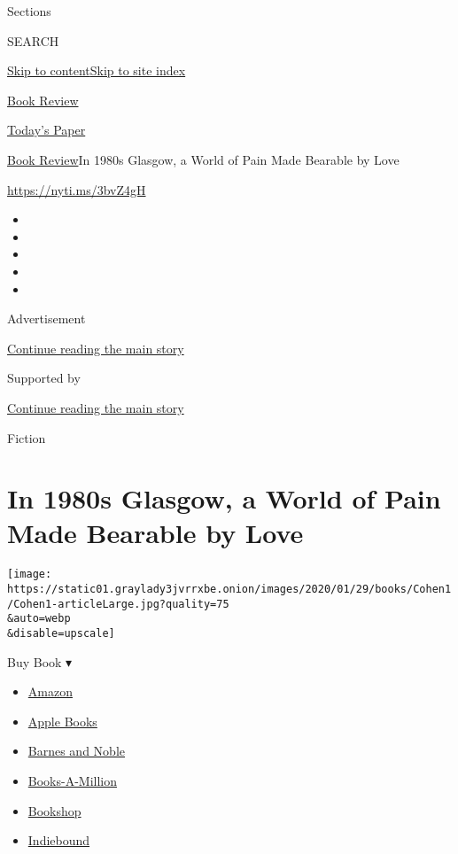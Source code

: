 Sections

SEARCH

\protect\hyperlink{site-content}{Skip to
content}\protect\hyperlink{site-index}{Skip to site index}

\href{https://www.nytimes3xbfgragh.onion/section/books/review}{Book
Review}

\href{https://myaccount.nytimes3xbfgragh.onion/auth/login?response_type=cookie\&client_id=vi}{}

\href{https://www.nytimes3xbfgragh.onion/section/todayspaper}{Today's
Paper}

\href{/section/books/review}{Book Review}\textbar{}In 1980s Glasgow, a
World of Pain Made Bearable by Love

\url{https://nyti.ms/3bvZ4gH}

\begin{itemize}
\item
\item
\item
\item
\item
\end{itemize}

Advertisement

\protect\hyperlink{after-top}{Continue reading the main story}

Supported by

\protect\hyperlink{after-sponsor}{Continue reading the main story}

Fiction

\hypertarget{in-1980s-glasgow-a-world-of-pain-made-bearable-by-love}{%
\section{In 1980s Glasgow, a World of Pain Made Bearable by
Love}\label{in-1980s-glasgow-a-world-of-pain-made-bearable-by-love}}

\texttt{[image: https://static01.graylady3jvrrxbe.onion/images/2020/01/29/books/Cohen1/Cohen1-articleLarge.jpg?quality=75\\\&auto=webp\\\&disable=upscale]}

Buy Book ▾

\begin{itemize}
\tightlist
\item
  \href{https://www.amazon.com/gp/search?index=books\&tag=NYTBSREV-20\&field-keywords=Shuggie+Bain+Douglas+Stuart}{Amazon}
\item
  \href{https://du-gae-books-dot-nyt-du-prd.appspot.com/buy?title=Shuggie+Bain\&author=Douglas+Stuart}{Apple
  Books}
\item
  \href{https://www.anrdoezrs.net/click-7990613-11819508?url=https\%3A\%2F\%2Fwww.barnesandnoble.com\%2Fw\%2F\%3Fean\%3D9780802148049}{Barnes
  and Noble}
\item
  \href{https://www.anrdoezrs.net/click-7990613-35140?url=https\%3A\%2F\%2Fwww.booksamillion.com\%2Fp\%2FShuggie\%2BBain\%2FDouglas\%2BStuart\%2F9780802148049}{Books-A-Million}
\item
  \href{https://bookshop.org/a/3546/9780802148049}{Bookshop}
\item
  \href{https://www.indiebound.org/book/9780802148049?aff=NYT}{Indiebound}
\end{itemize}

